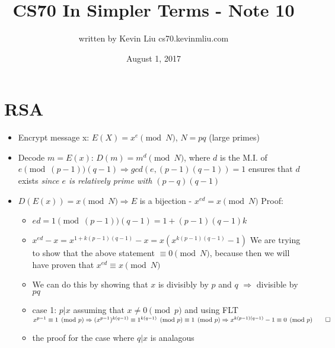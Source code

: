 \documentclass[a4paper]{article}
\title{CS70 In Simpler Terms - Note 10}
\author{written by Kevin Liu cs70.kevinmliu.com}
\date{August 1, 2017}
\begin{document}
\maketitle

\section{RSA}
\begin{itemize}
    \item Encrypt message x: $E(X) = x^e\pmod N$, $N = pq$ (large primes)
    \item Decode $m = E(x)$: $D(m) = m^d \pmod N$, where $d$ is the M.I. of $e\pmod (p-1)(q-1) \Rightarrow gcd(e, (p-1)(q-1)) = 1$ ensures that $d$ exists \textit{since $e$ is relatively prime with $(p-q)(q-1)$}
    \item $D(E(x)) = x\pmod N \Rightarrow E$ is a bijection - \textbf{$x^{ed} = x\pmod N$} \newline Proof:
    \begin{itemize}
        \item $ed = 1\pmod (p-1)(q-1) = 1 + (p-1)(q-1)k$
        \item $x^{ed} - x = x^{1+k(p-1)(q-1)} - x = x(x^{k(p-1)(q-1)} - 1)$ \newline We are trying to show that the above statement $\equiv 0 \pmod N$, because then we will have proven that $x^{ed} \equiv x \pmod N$
        \item We can do this by showing that $x$ is divisibly by $p$ and $q$ $\Rightarrow$ divisible by $pq$
        \item case 1: $p | x$ \newline assuming that $x \neq 0\pmod p$ and using FLT \newline
        $x^{p-1} \equiv 1\pmod p \Rightarrow (x^{p-1})^{k(q-1)} \equiv 1^{k(q-1)} \pmod p \equiv 1 \pmod p \Rightarrow x^{k(p-1)(q-1)} -1 \equiv 0 \pmod p \qed$
        \item the proof for the case where $q|x$ is analagous
     \end{itemize}
\end{itemize}
\end{document}

